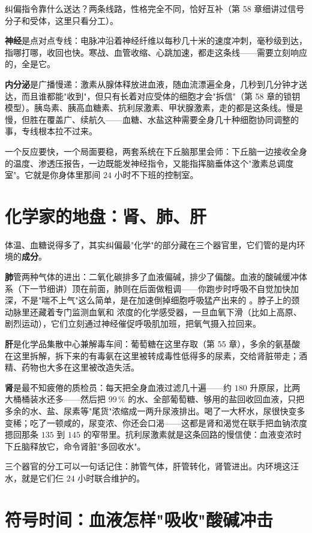 纠偏指令靠什么送达？两条线路，性格完全不同，恰好互补（第 58 章细讲过信号分子和受体，这里只看分工）。

\textbf{神经}是点对点专线：电脉冲沿着神经纤维以每秒几十米的速度冲刺，毫秒级到达，指哪打哪，收回也快。寒战、血管收缩、心跳加速，都走这条线——需要立刻响应的，全是它。

\textbf{内分泌}是广播慢递：激素从腺体释放进血液，随血流漂遍全身，几秒到几分钟才送达，而且谁都能"收到"，但只有长着对应受体的细胞才会"拆信"（第 58 章的锁钥模型）。胰岛素、胰高血糖素、抗利尿激素、甲状腺激素，走的都是这条线。慢是慢，但胜在覆盖广、续航久——血糖、水盐这种需要全身几十种细胞协同调整的事，专线根本拉不过来。

一个反应要快，一个局面要稳，两套系统在下丘脑那里会师：下丘脑一边接收全身的温度、渗透压报告，一边既能发神经指令，又能指挥脑垂体这个"激素总调度室"。它就是你身体里那间 $24$ 小时不下班的控制室。

\section{化学家的地盘：肾、肺、肝}

体温、血糖说得多了，其实纠偏最"化学"的部分藏在三个器官里，它们管的是内环境的\textbf{成分}。

\textbf{肺}管两种气体的进出：二氧化碳排多了血液偏碱，排少了偏酸。血液的酸碱缓冲体系（下一节细讲）顶在前面，肺则在后面做粗调——你跑步时呼吸不自觉加快加深，不是"喘不上气"这么简单，是在加速倒掉细胞呼吸猛产出来的 。脖子上的颈动脉里还藏着专门监测血氧和  浓度的化学感受器，一旦血氧下滑（比如上高原、剧烈运动），它们立刻通过神经催促呼吸肌加班，把氧气摄入拉回来。

\textbf{肝}是化学品集散中心兼解毒车间：葡萄糖在这里存取（第 55 章），多余的氨基酸在这里拆解，拆下来的有毒氨在这里被转成毒性低得多的尿素，交给肾脏带走；酒精、药物也大多在这里被改造失活。

\textbf{肾}是最不知疲倦的质检员：每天把全身血液过滤几十遍——约 $180$ 升原尿，比两大桶桶装水还多——然后把 $99\,\%$ 的水、全部葡萄糖、够用的盐回收回血液，只把多余的水、盐、尿素等"尾货"浓缩成一两升尿液排出。喝了一大杯水，尿很快变多变稀；吃了一顿咸的，尿变浓、你还会口渴——这都是肾和渴觉在联手把血钠浓度摁回那条 $135$ 到 $145$ 的窄带里。抗利尿激素就是这条回路的慢信使：血液变浓时下丘脑释放它，命令肾脏"多回收水"。

三个器官的分工可以一句话记住：肺管气体，肝管转化，肾管进出。内环境这汪水，就是它们仨 $24$ 小时联合维护的。

\section{符号时间：血液怎样"吸收"酸碱冲击}

